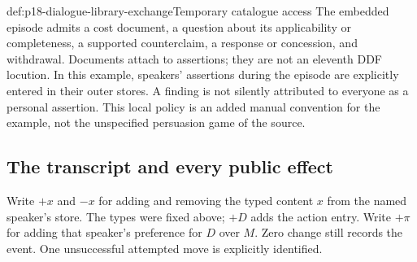 \begin{hbexample}{def:p18-dialogue-library-exchange}{Temporary catalogue access}
The embedded episode admits a cost document, a question about its
applicability or completeness, a supported counterclaim, a response
or concession, and withdrawal. Documents attach to assertions;
they are not an eleventh DDF locution. In this example, speakers'
assertions during the episode are explicitly entered in their outer
stores. A finding is not silently attributed to everyone as a personal
assertion. This local policy is an added manual convention for the
example, not the unspecified persuasion game of the source.
\end{hbexample}

\subsection{The transcript and every public effect}

Write \(+x\) and \(-x\) for adding and removing the typed content \(x\)
from the named speaker's store. The types were fixed above;
\(+D\) adds the action entry. Write \(+\pi\) for adding that speaker's
preference for \(D\) over \(M\). Zero change still records the event.
One unsuccessful attempted move is explicitly identified.

